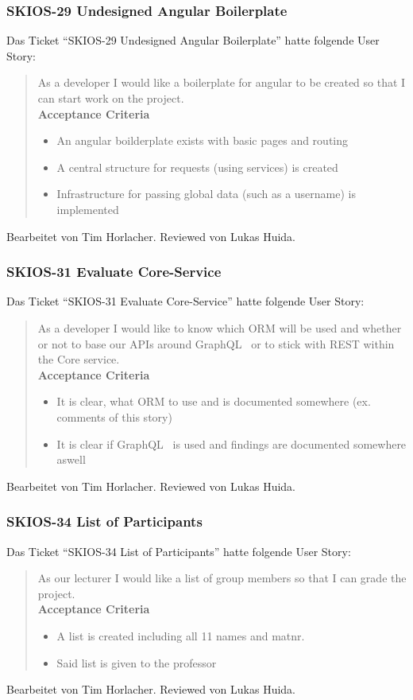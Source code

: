 \subsubsection{SKIOS-29 Undesigned Angular Boilerplate}
Das Ticket \enquote{SKIOS-29 Undesigned Angular Boilerplate} hatte folgende User Story:
\begin{quotation}
    As a developer I would like a boilerplate for angular to be created so that I can start work on the project. \\
    \textbf{Acceptance Criteria}
    \begin{itemize}
        \item An angular boilderplate exists with basic pages and routing
        \item A central structure for requests (using services) is created
        \item Infrastructure for passing global data (such as a username) is implemented
    \end{itemize}
\end{quotation}
Bearbeitet von Tim Horlacher.
Reviewed von Lukas Huida.

\subsubsection{SKIOS-31 Evaluate Core-Service}
Das Ticket \enquote{SKIOS-31 Evaluate Core-Service} hatte folgende User Story:
\begin{quotation}
    As a developer I would like to know which ORM will be used and whether or not to base our APIs around GraphQL~\parencite{web/GraphQL} or to stick with REST within the Core service. \\
    \textbf{Acceptance Criteria}
    \begin{itemize}
        \item It is clear, what ORM to use and is documented somewhere (ex. comments of this story)
        \item It is clear if GraphQL~\parencite{web/GraphQL} is used and findings are documented somewhere aswell
    \end{itemize}
\end{quotation}
Bearbeitet von Tim Horlacher.
Reviewed von Lukas Huida.

\subsubsection{SKIOS-34 List of Participants}
Das Ticket \enquote{SKIOS-34 List of Participants} hatte folgende User Story:
\begin{quotation}
    As our lecturer I would like a list of group members so that I can grade the project. \\
    \textbf{Acceptance Criteria}
    \begin{itemize}
        \item A list is created including all 11 names and matnr.
        \item Said list is given to the professor
    \end{itemize}
\end{quotation}
Bearbeitet von Tim Horlacher.
Reviewed von Lukas Huida.

